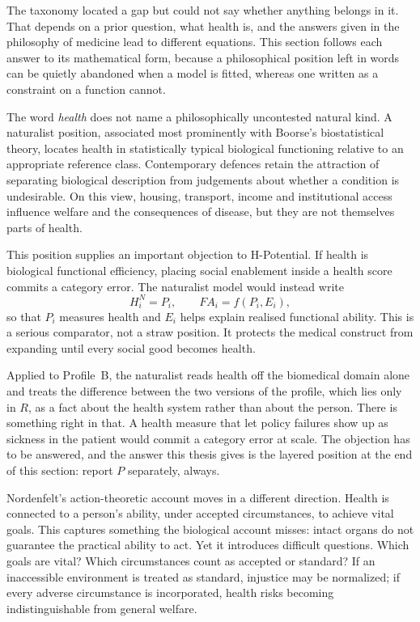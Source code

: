 The taxonomy located a gap but could not say whether anything belongs in it. That depends on a prior question, what health is, and the answers given in the philosophy of medicine lead to different equations. This section follows each answer to its mathematical form, because a philosophical position left in words can be quietly abandoned when a model is fitted, whereas one written as a constraint on a function cannot.

The word \emph{health} does not name a philosophically uncontested natural
kind. A naturalist position, associated most prominently with Boorse's
biostatistical theory, locates health in statistically typical biological
functioning relative to an appropriate reference class. Contemporary defences
retain the attraction of separating biological description from judgements
about whether a condition is undesirable. \citep{schwartz_2014_boorse} On this
view, housing, transport, income and institutional access influence welfare and
the consequences of disease, but they are not themselves parts of health.

This position supplies an important objection to H-Potential. If health is
biological functional efficiency, placing social enablement inside a health
score commits a category error. The naturalist model would instead write
\[
H_i^{N}=P_i,
\qquad
FA_i=f(P_i,E_i),
\]
so that $P_i$ measures health and $E_i$ helps explain realised functional
ability. This is a serious comparator, not a straw position. It protects the
medical construct from expanding until every social good becomes health.

Applied to Profile~B, the naturalist reads health off the biomedical domain
alone and treats the difference between the two versions of the profile, which
lies only in $R$, as a fact about the health system rather than about the
person. There is something right in that. A health measure that let policy
failures show up as sickness in the patient would commit a category error at
scale. The objection has to be answered, and the answer this thesis gives is
the layered position at the end of this section: report $P$ separately,
always.

Nordenfelt's action-theoretic account moves in a different direction. Health is
connected to a person's ability, under accepted circumstances, to achieve vital
goals. \citep{nordenfelt_1995} This captures something the biological account
misses: intact organs do not guarantee the practical ability to act. Yet it
introduces difficult questions. Which goals are vital? Which circumstances
count as accepted or standard? If an inaccessible environment is treated as
standard, injustice may be normalized; if every adverse circumstance is
incorporated, health risks becoming indistinguishable from general welfare.

